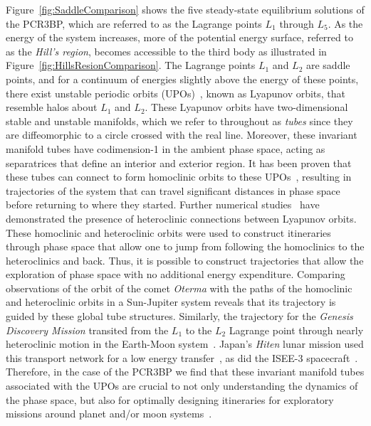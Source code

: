 \documentclass[11pt]{article}
\numberwithin{equation}{section}
\theoremstyle{plain}
\begin{document}
Figure~\ref{fig:SaddleComparison} shows the  five steady-state equilibrium solutions of the PCR3BP, which are referred to as the Lagrange points $L_1$ through $L_5$. As the energy of the system increases, more of the potential energy surface, referred to as the {\em Hill's region}, becomes accessible to the third body as illustrated in Figure~\ref{fig:HillsResionComparison}. 
The Lagrange points $L_1$ and $L_2$ are saddle points, and for a continuum of energies slightly above the energy of these points, there exist unstable periodic orbits (UPOs)~\cite{Moser,Wiggins}, known as Lyapunov orbits, that resemble halos about $L_1$ and $L_2$. 
These Lyapunov orbits have two-dimensional stable and unstable manifolds, which we refer to throughout as {\em tubes} since they are diffeomorphic to a circle crossed with the real line. 
Moreover, these invariant manifold tubes have codimension-1 in the ambient phase space, acting as separatrices that define an interior and exterior region.
It has been proven that these tubes can connect to form homoclinic orbits to these UPOs~\cite{Hom3BP,McGehee,Conley}, resulting in trajectories of the system that can travel significant distances in phase space before returning to where they started. Further numerical studies~\cite{Koon} have demonstrated the presence of heteroclinic connections between Lyapunov orbits. These homoclinic and heteroclinic orbits were used to construct itineraries through phase space that allow one to jump from following the homoclinics to the heteroclinics and back. 
Thus, it is possible to construct trajectories that allow the exploration of phase space with no additional energy expenditure. Comparing observations of the orbit of the comet {\em Oterma} with the paths of the homoclinic and heteroclinic orbits in a Sun-Jupiter system reveals that its trajectory is guided by these global tube structures. Similarly, the trajectory for the {\em Genesis Discovery Mission} transited from the $L_1$ to the $L_2$ Lagrange point through nearly heteroclinic motion in the Earth-Moon system~\cite{LoGenesis,KoonGenesis}. 
Japan's {\em Hiten} lunar mission used this transport network for a low energy transfer~\cite{Hiten}, as did the ISEE-3 spacecraft~\cite{ISEE3}. 
Therefore, in the case of the PCR3BP we find that these invariant manifold tubes associated with the UPOs are crucial to not only understanding the dynamics of the phase space, but also for optimally designing itineraries for exploratory missions around planet and/or moon systems~\cite{RossL1}. 
\end{document}
